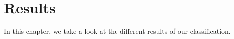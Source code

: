 \chapter{Results}
In this chapter, we take a look at the different results of our classification.

\begin{table}
    \centering
    
\end{table}
